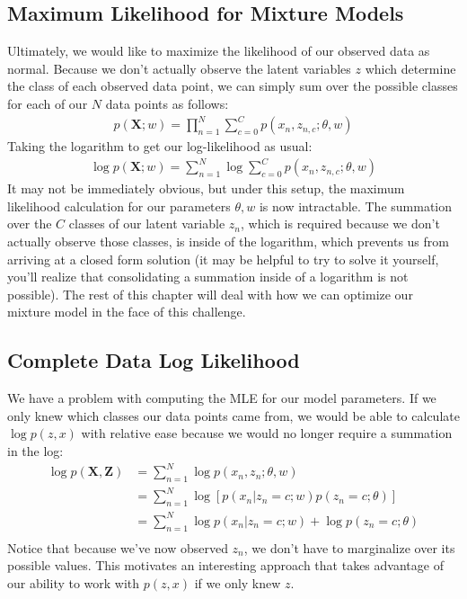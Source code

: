 \subsection{Maximum Likelihood for Mixture Models}
Ultimately, we would like to maximize the likelihood of our observed data as normal. Because we don't actually observe the latent variables $z$ which determine the class of each observed data point, we can simply sum over the possible classes for each of our $N$ data points as follows:
\begin{align*}
    p(\textbf{X}; w) = \prod_{n=1}^{N} \sum_{c=0}^{C} p(x_{n}, z_{n, c}; \theta, w)
\end{align*}
Taking the logarithm to get our log-likelihood as usual:
\begin{align} \label{intractable-log-likelihood}
    \log p(\textbf{X}; w) = \sum_{n=1}^{N} \log \sum_{c=0}^{C} p(x_{n}, z_{n, c}; \theta, w)
\end{align}
It may not be immediately obvious, but under this setup, the maximum likelihood calculation for our parameters $\theta, w$ is now intractable. The summation over the $C$ classes of our latent variable $z_{n}$, which is required because we don't actually observe those classes, is inside of the logarithm, which prevents us from arriving at a closed form solution (it may be helpful to try to solve it yourself, you'll realize that consolidating a summation inside of a logarithm is not possible). The rest of this chapter will deal with how we can optimize our mixture model in the face of this challenge.

\subsection{Complete Data Log Likelihood}
We have a problem with computing the MLE for our model parameters. If we only knew which classes our data points came from, we would be able to calculate $\log p(z, x)$ with relative ease because we would no longer require a summation in the log:
\begin{align} \label{complete-data-log-likelihood}
    \log p(\textbf{X}, \textbf{Z}) &= \sum_{n=1}^{N} \log p(x_n, z_n; \theta, w) \\
    &= \sum_{n=1}^{N} \log[p(x_n | z_n = c; w) p(z_n = c; \theta)] \\
    &= \sum_{n=1}^{N} \log p(x_n | z_n = c; w) + \log p(z_n = c; \theta) \\
\end{align}
Notice that because we've now observed $z_{n}$, we don't have to marginalize over its possible values. This motivates an interesting approach that takes advantage of our ability to work with $p(z, x)$ if we only knew $z$.

